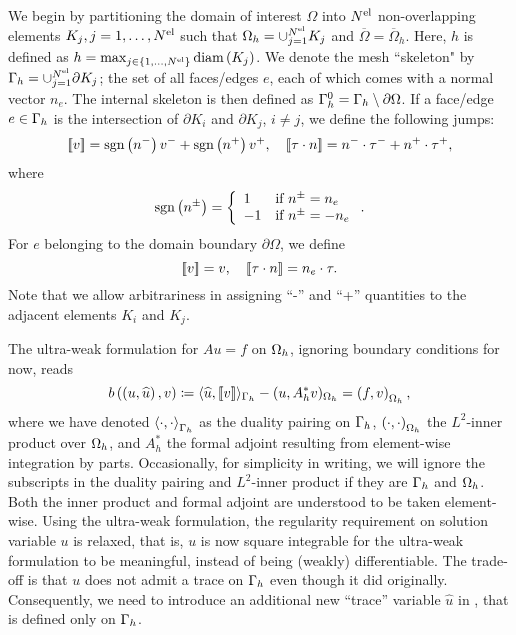 We begin by partitioning the domain of interest $\Omega$ into $\Nel$ non-overlapping elements $K_j, j = 1,\hdots,\Nel$ such that $\Oh = \cup_{j=1}^\Nel K_j$ and $\overline{\Omega} = \overline{\Omega}_h$. Here, $h$ is defined as $h= \max_{j\in \LRc{1,\hdots,\Nel}}\text{diam}\LRp{K_j}$.  We denote the mesh ``skeleton" by $\Gh = \cup_{j=1}^\Nel \partial K_j$; the set of all faces/edges $e$, each of which comes with a normal vector ${n}_e$. The internal skeleton is then defined as $\Gamma^0_h = \Gh \setminus \partial \Omega$. If a face/edge $e \in \Gh$ is the intersection of $\partial K_i$ and $\partial K_j$, $i \ne j$, we define the following jumps:
\[
\jump{v} = \text{sgn} \LRp{{n}^-}v^- + \text{sgn} \LRp{{n}^+}v^+, \quad
\jump{\tau \cdot n} = {n}^-\cdot \tau^- + {n}^+\cdot\tau^+,
\]
where
\[
\text{sgn}\LRp{{n}^{\pm}} =
\left\{
\begin{array}{ll}
1 & \text{if } {n}^{\pm} = {n}_e \\
-1 & \text{if } {n}^\pm = -{n}_e
\end{array}
\right..
\]
For $e$ belonging to the domain boundary $\partial \Omega$, we define
\[
\jump{v} = v, \quad
\jump{\tau \cdot n} = {n}_e\cdot \tau.
\]
Note that we allow arbitrariness in assigning ``-'' and ``+'' quantities to the adjacent elements $K_i$ and $K_j$.

The ultra-weak formulation for $Au = f$ on $\Oh$, ignoring boundary
conditions for now, reads
\begin{equation}
\eqnlab{uweak}
b\left(\left(u, \widehat{u}\right),v\right) \coloneqq \langle \widehat{u}, \jump{v}
\rangle_{\Gh} - (u,A_h^*v)_{\Oh}= \LRp{f,v}_{\Oh},
\end{equation}
where we have denoted $\LRa{\cdot,\cdot}_{\Gh}$ as the duality
pairing on $\Gh$, $\LRp{\cdot,\cdot}_{\Oh}$ the $L^2$-inner
product over $\Oh$, and $A_h^*$ the formal adjoint resulting from
element-wise integration by parts.  Occasionally, for simplicity in
writing, we will ignore the subscripts in the duality pairing and
$L^2$-inner product if they are $\Gh$ and $\Oh$. Both the
inner product and formal adjoint are understood to be taken
element-wise. Using the ultra-weak formulation, the regularity
requirement on solution variable $u$ is relaxed, that is, $u$ is now
square integrable for the ultra-weak formulation  to be
meaningful, instead of being (weakly) differentiable.  The trade-off
is that $u$ does not admit a trace on $\Gh$ even though it did
originally. Consequently, we need to introduce an additional new
``trace'' variable $\widehat{u}$ in , that is defined only on
$\Gh$.

